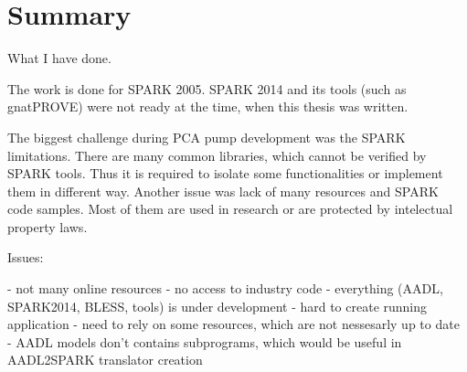
\cleardoublepage

\chapter{Summary}
\label{summary}

What I have done.

The work is done for SPARK 2005. SPARK 2014 and its tools (such as gnatPROVE) were not ready at the time, when this thesis was written.

The biggest challenge during PCA pump development was the SPARK limitations. There are many common libraries, which cannot be verified by SPARK tools. Thus it is required to isolate some functionalities or implement them in different way. Another issue was lack of many resources and SPARK code samples. Most of them are used in research or are protected by intelectual property laws. 

Issues:

- not many online resources
- no access to industry code
- everything (AADL, SPARK2014, BLESS, tools) is under development
- hard to create running application
- need to rely on some resources, which are not nessesarly up to date
- AADL models don't contains subprograms, which would be useful in AADL2SPARK translator creation